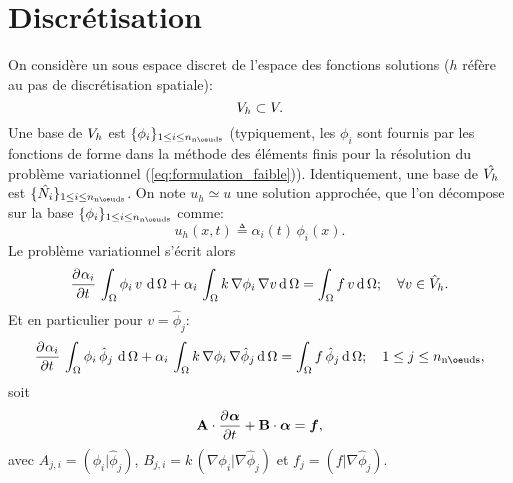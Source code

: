 \documentclass[11pt,a4paper]{article}
\newcommand{\nnodes}{{n_{\labelname{nœuds}}}}
\begin{document}
\section{Discrétisation}						
On considère un sous espace discret de l'espace des fonctions solutions ($h$ réfère au pas de discrétisation spatiale):
$$  V_h \subset V.$$
%
Une base de $V_h$ est $\{\phi_i\}_{1\leq i\leq \nnodes}$ (typiquement, les $\phi_i$ sont fournis par les fonctions de forme dans la méthode des éléments finis \cite[sec. 1.4]{ern2013theory} pour la résolution du problème variationnel (\ref{eq:formulation_faible})). 
%
Identiquement, une base de $\hat{V_h}$ est $\{\hat{N_i}\}_{1\leq i\leq \nnodes}$.
On note $u_h \simeq u$ une solution approchée, que l'on décompose sur la base $\{\phi_i\}_{1\leq i\leq \nnodes}$ comme:
$$u_h(x,t)\triangleq \alpha_i(t)\,\phi_i(x).$$
Le problème variationnel s'écrit alors 
$$
\frac{\partial^{} \alpha_i}{\partial t^{}}\,\int_\Omega \phi_i \, v\,\operatorname{d} \Omega + \alpha_i\,\int_\Omega k\,\nabla \phi_i\, \nabla v \operatorname{d} \Omega = \int_\Omega f\, v \operatorname{d} \Omega;\quad\forall v\in\hat{V}_h.
$$
Et en particulier pour $v=\hat{\phi}_j$:
$$
\nthpartial{\alpha_i}{t}{}\,\int_\Omega \phi_i \, \hat{\phi}_j\,\d \Omega + \alpha_i\,\int_\Omega k\,\nabla \phi_i\, \nabla \hat{\phi}_j \d \Omega = \int_\Omega f\, \hat{\phi}_j \d \Omega;\quad 1\leq j \leq \nnodes,
$$
soit 
\begin{equation}
\label{eq:Systeme_dynamique_discret}
\mathbf{A}\cdot\frac{\partial^{} \boldsymbol{\alpha}}{\partial t^{}} + \mathbf{B}\cdot\boldsymbol{\alpha} = \boldsymbol{f},
\end{equation}
%
avec $A_{j,i} = \left( \phi_i \vert \hat{\phi}_j\right)$, $B_{j,i} = k\, \left( \nabla \phi_i \vert \nabla \hat{\phi}_j \right)$ et $f_j = \left( f \vert \nabla \hat{\phi}_j \right).$
%
\end{document}
